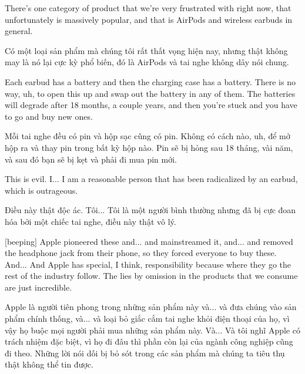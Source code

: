 \documentclass[a4paper]{article}
\begin{document}
	There's one category of product that we're very frustrated with right now, that unfortunately is massively popular, and that is AirPods and wireless earbuds in general.
	
	\begin{vietnamese-v2}
		Có một loại sản phẩm mà chúng tôi rất thất vọng hiện nay, nhưng thật không may là nó lại cực kỳ phổ biến, đó là AirPods và tai nghe không dây nói chung.
	\end{vietnamese-v2}
	
	Each earbud has a battery and then the charging case has a battery.
	There is no way, uh, to open this up and swap out the battery in any of them.
	The batteries will degrade after 18 months, a couple years, and then you're stuck and you have to go and buy new ones.
	
	\begin{vietnamese-v2}
		Mỗi tai nghe đều có pin và hộp sạc cũng có pin.
		Không có cách nào, uh, để mở hộp ra và thay pin trong bất kỳ hộp nào.
		Pin sẽ bị hỏng sau 18 tháng, vài năm, và sau đó bạn sẽ bị kẹt và phải đi mua pin mới.
	\end{vietnamese-v2}
	
	
	This is evil.
	I... I am a reasonable person that has been radicalized by an earbud, which is outrageous.
	
	\begin{vietnamese-v2}
		Điều này thật độc ác.
		Tôi... Tôi là một người bình thường nhưng đã bị cực đoan hóa bởi một chiếc tai nghe, điều này thật vô lý.
	\end{vietnamese-v2}
	
	
	[beeping]
	Apple pioneered these and... and mainstreamed it, and... and removed the headphone jack from their phone, so they forced everyone to buy these.
	And... And Apple has special, I think, responsibility because where they go the rest of the industry follow.
	The lies by omission in the products that we consume are just incredible.
	
	\begin{vietnamese-v2}
		[bíp]
		Apple là người tiên phong trong những sản phẩm này và... và đưa chúng vào sản phẩm chính thống, và... và loại bỏ giắc cắm tai nghe khỏi điện thoại của họ, vì vậy họ buộc mọi người phải mua những sản phẩm này.
		Và... Và tôi nghĩ Apple có trách nhiệm đặc biệt, vì họ đi đâu thì phần còn lại của ngành công nghiệp cũng đi theo.
		Những lời nói dối bị bỏ sót trong các sản phẩm mà chúng ta tiêu thụ thật không thể tin được.
	\end{vietnamese-v2}
	
\end{document}
